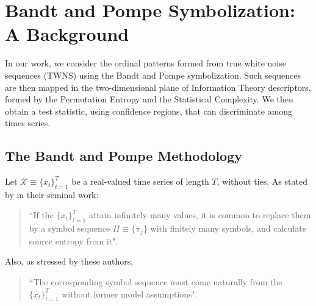 \section{Bandt and Pompe Symbolization: A Background}\label{Sec:BP}

In our work, we consider the ordinal patterns formed from true white noise sequences (TWNS) using the Bandt and Pompe symbolization.
Such sequences are then mapped in the two-dimensional plane of Information Theory descriptors, formed by the Permutation Entropy and the Statistical Complexity.
We then obtain a test statistic, using confidence regions, that can discriminate among times series.

\subsection{The Bandt and Pompe Methodology}\label{Sec:BPMethodology}

Let ${\mathcal X} \equiv \{x_t\}_{t=1}^{T}$ be a real-valued time series of length $T$, without ties. 
As stated by  in their seminal work:  
\begin{quote}
	``If the $\{x_t\}_{t=1}^{T}$ attain infinitely many values, it is common to replace them by a symbol sequence 
	$\Pi \equiv \{\pi_j\}$ with finitely many symbols, and calculate source entropy from it".
\end{quote}
Also, as stressed by these authors, 
\begin{quote}
	``The corresponding symbol sequence must come 
	naturally from the $\{x_t\}_{t=1}^{T}$ without former model assumptions".
\end{quote}

